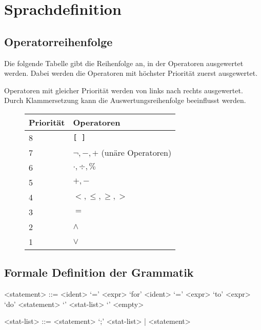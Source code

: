 \section{Sprachdefinition}

\subsection{Operatorreihenfolge}

Die folgende Tabelle gibt die Reihenfolge an, in der Operatoren ausgewertet werden. Dabei werden die Operatoren mit höchster Priorität zuerst ausgewertet.

Operatoren mit gleicher Priorität werden von links nach rechts ausgewertet. Durch Klammersetzung kann die Auswertungsreihenfolge beeinflusst werden.

\begin{figure}[H]
\begin{tabular}{|l|l|}
\hline
\textbf{Priorität} & \textbf{Operatoren} \\
\hline
8 & \texttt{{[}\,{]}} \\
\hline
7 & $\neg, -, +$ (unäre Operatoren)\\
\hline
6 & $\cdot, \div, \%$\\
\hline
5 & $+, -$\\
\hline
4 & $<, \leq, \geq, >$\\
\hline
3 & $=$\\
\hline
2 & $\wedge$ \\
\hline
1 & $\vee$ \\
\hline
\end{tabular}
\end{figure}

\subsection{Formale Definition der Grammatik}

\setlength{\grammarparsep}{20pt plus 1pt minus 1pt} %
\setlength{\grammarindent}{12em} %

\begin{grammar}

<statement> ::= <ident> `=' <expr> 
\alt `for' <ident> `=' <expr> `to' <expr> `do' <statement> 
\alt `{' <stat-list> `}' 
\alt <empty> 

<stat-list> ::= <statement> `;' <stat-list> | <statement> 

\end{grammar}
